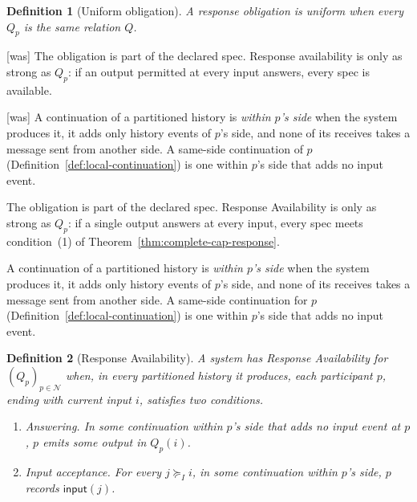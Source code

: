 \documentclass[sigconf]{cidr-2027}
\newtheorem{definition}{Definition}
\theoremstyle{remark}
\newcommand{\InputGe}{\succeq_I}
\begin{document}
\begin{definition}[Uniform obligation]
\label{def:uniform-obligation}
A response obligation is \emph{uniform} when every $Q_p$ is the same
relation $Q$.
\end{definition}



{\footnotesize\color{black!50}\noindent\textsf{[was]} The obligation is part of the declared spec.  Response availability
is only as strong as $Q_p$: if an output permitted at every input answers,
every spec is available.\par}



{\footnotesize\color{black!50}\noindent\textsf{[was]} A continuation of a partitioned history is \emph{within $p$'s side} when
the system produces it, it adds only history events of $p$'s side, and none of its
receives takes a message sent from another side.  A same-side continuation
of $p$ (Definition~\ref{def:local-continuation}) is one within $p$'s side
that adds no input event.\par}

\color{blue!70!black}The obligation is part of the declared spec.  Response Availability is only
as strong as $Q_p$: if a single output answers at every input, every spec
meets condition~(1) of Theorem~\ref{thm:complete-cap-response}.\color{black}

\color{blue!70!black}A continuation of a partitioned history is \emph{within $p$'s side} when
the system produces it, it adds only history events of $p$'s side, and none of its
receives takes a message sent from another side.  A same-side continuation
for $p$ (Definition~\ref{def:local-continuation}) is one within $p$'s side
that adds no input event.\color{black}

\begin{definition}[Response Availability]
\label{def:response-availability}
A system has \emph{Response Availability} for $(Q_p)_{p\in\mathcal N}$ when, in every
partitioned history it produces, each participant $p$, ending with current
input $i$, satisfies two conditions.
\begin{enumerate}
  \item \emph{Answering.}  In some continuation within $p$'s side that
        adds no input event at $p$, $p$ emits some output in $Q_p(i)$.
  \item \emph{Input acceptance.}  For every $j\InputGe i$, in some
        continuation within $p$'s side, $p$ records $\mathsf{input}(j)$.
\end{enumerate}
\end{definition}
\end{document}
